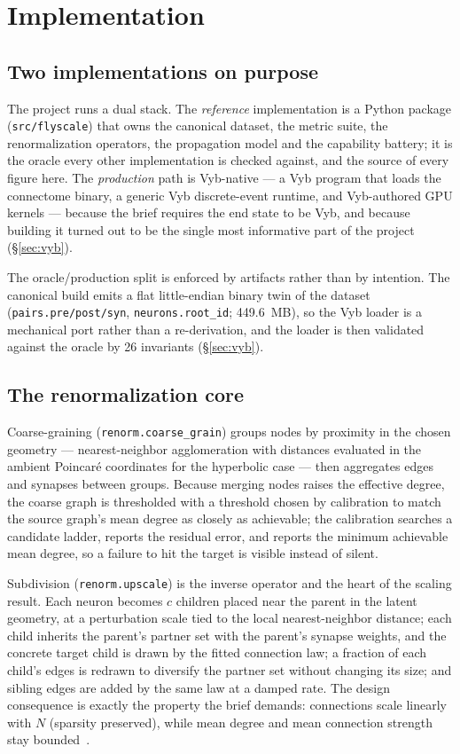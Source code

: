 \documentclass[11pt,a4paper]{article}
\newcommand{\code}[1]{\texttt{\footnotesize #1}}
\begin{document}
\section{Implementation}
\label{sec:impl}

\subsection{Two implementations on purpose}
The project runs a dual stack. The \emph{reference} implementation is a Python package
(\code{src/flyscale}) that owns the canonical dataset, the metric suite, the renormalization
operators, the propagation model and the capability battery; it is the oracle every other
implementation is checked against, and the source of every figure here. The \emph{production}
path is Vyb-native --- a Vyb program that loads the connectome binary, a generic Vyb
discrete-event runtime, and Vyb-authored GPU kernels --- because the brief requires the end state
to be Vyb, and because building it turned out to be the single most informative part of the
project (\S\ref{sec:vyb}).

The oracle/production split is enforced by artifacts rather than by intention. The canonical
build emits a flat little-endian binary twin of the dataset (\code{pairs.pre/post/syn},
\code{neurons.root\_id}; 449.6~MB), so the Vyb loader is a mechanical port rather than a
re-derivation, and the loader is then validated against the oracle by 26 invariants
(\S\ref{sec:vyb}).

\subsection{The renormalization core}
Coarse-graining (\code{renorm.coarse\_grain}) groups nodes by proximity in the chosen geometry
--- nearest-neighbor agglomeration with distances evaluated in the ambient Poincaré coordinates
for the hyperbolic case --- then aggregates edges and synapses between groups. Because merging
nodes raises the effective degree, the coarse graph is thresholded with a threshold chosen by
calibration to match the source graph's mean degree as closely as achievable; the calibration
searches a candidate ladder, reports the residual error, and reports the minimum achievable mean
degree, so a failure to hit the target is visible instead of silent.

Subdivision (\code{renorm.upscale}) is the inverse operator and the heart of the scaling result.
Each neuron becomes $c$ children placed near the parent in the latent geometry, at a
perturbation scale tied to the local nearest-neighbor distance; each child inherits the parent's
partner set with the parent's synapse weights, and the concrete target child is drawn by the
fitted connection law; a fraction of each child's edges is redrawn to diversify the partner set
without changing its size; and sibling edges are added by the same law at a damped rate. The
design consequence is exactly the property the brief demands: connections scale linearly with
$N$ (sparsity preserved), while mean degree and mean connection strength stay
bounded~\cite{geom-renorm}.
\end{document}
